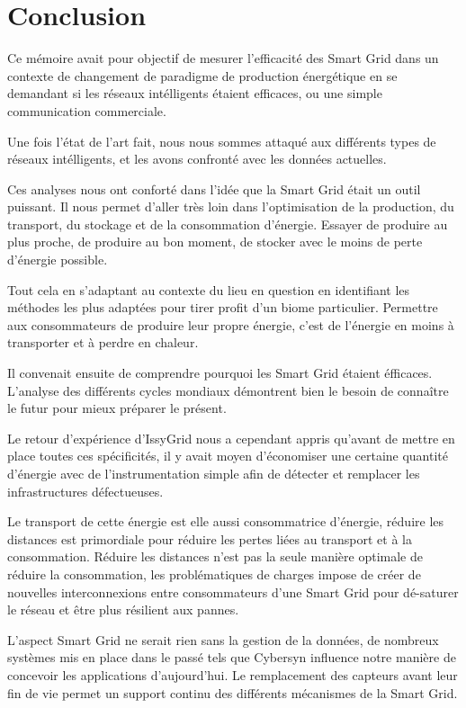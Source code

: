 \chapter*{Conclusion}

Ce mémoire avait pour objectif de mesurer l'efficacité des Smart Grid dans un contexte de changement
de paradigme de production énergétique en se demandant si les réseaux intélligents étaient efficaces,
ou une simple communication commerciale.

Une fois l'état de l'art fait, nous nous sommes attaqué aux différents types de réseaux intélligents,
et les avons confronté avec les données actuelles.

Ces analyses nous ont conforté dans l'idée que la Smart Grid était un outil puissant.
Il nous permet d'aller très loin dans l'optimisation de la production, du transport,
du stockage et de la consommation d'énergie.
Essayer de produire au plus proche, de produire au bon moment, de stocker avec le moins de perte
d'énergie possible.

Tout cela en s'adaptant au contexte du lieu en question en identifiant les méthodes
les plus adaptées pour tirer profit d'un biome particulier.
Permettre aux consommateurs de produire leur propre énergie,
c'est de l'énergie en moins à transporter et à perdre en chaleur.

Il convenait ensuite de comprendre pourquoi les Smart Grid étaient éfficaces.
L'analyse des différents cycles mondiaux démontrent bien le besoin de connaître le futur pour
mieux préparer le présent.

Le retour d'expérience d'IssyGrid nous a cependant appris qu'avant de mettre en place toutes ces spécificités,
il y avait moyen d'économiser une certaine quantité d'énergie avec de l'instrumentation
simple afin de détecter et remplacer les infrastructures défectueuses.

Le transport de cette énergie est elle aussi consommatrice d'énergie, réduire les distances est primordiale
pour réduire les pertes liées au transport et à la consommation.
Réduire les distances n'est pas la seule manière optimale de réduire la consommation,
les problématiques de charges impose de créer de nouvelles interconnexions entre consommateurs
d'une Smart Grid pour dé-saturer le réseau et être plus résilient aux pannes.

L'aspect Smart Grid ne serait rien sans la gestion de la données, de nombreux systèmes mis en place
dans le passé tels que Cybersyn influence notre manière de concevoir les applications d'aujourd'hui.
Le remplacement des capteurs avant leur fin de vie permet un support continu des différents
mécanismes de la Smart Grid.

